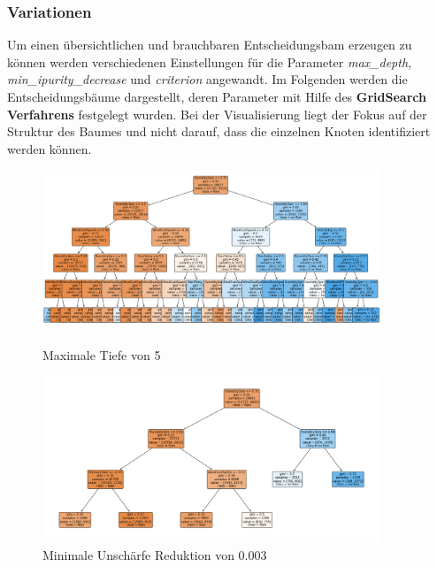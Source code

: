 \subsubsection{Variationen}
Um einen übersichtlichen und brauchbaren Entscheidungsbam erzeugen zu können werden verschiedenen Einstellungen für die Parameter \emph{max\_depth, min\_ipurity\_decrease} und \emph{criterion} angewandt. Im Folgenden werden die Entscheidungsbäume dargestellt, deren Parameter mit Hilfe des \textbf{GridSearch Verfahrens} festgelegt wurden. Bei der Visualisierung liegt der Fokus auf der Struktur des Baumes und nicht darauf, dass die einzelnen Knoten identifiziert werden können.\\
\begin{figure}[H]
    \centering
     \begin{minipage}{0.30\textwidth}
        \centering
        \includegraphics[width=0.9\textwidth]{Bilder/treeMaxDepth} %
        \caption{Maximale Tiefe von 5}
        \label{fig:treeMaxDepth}
    \end{minipage}\hfill
    \begin{minipage}{0.30\textwidth}
        \centering
        \includegraphics[width=0.9\textwidth]{Bilder/treeMinImpurityDecrease} %
        \caption{Minimale Unschärfe Reduktion von 0.003}
        \label{fig:treeMinImpurityDecrease}

\end{minipage}
\end{figure}
